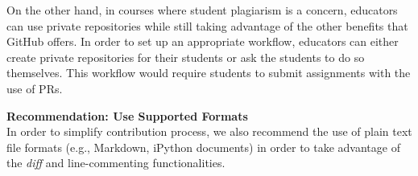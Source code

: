 
On the other hand, in courses where student plagiarism is a concern, educators can use private repositories while still taking advantage of the other benefits that GitHub offers. In order to set up an appropriate workflow, educators can either create private repositories for their students or ask the students to do so themselves. This workflow would require students to submit assignments with the use of PRs.

\textbf{Recommendation: Use Supported Formats}\\
In order to simplify contribution process, we also recommend the use of plain text file formats (e.g., Markdown, iPython documents) in order to take advantage of the \textit{diff} and line-commenting functionalities.


